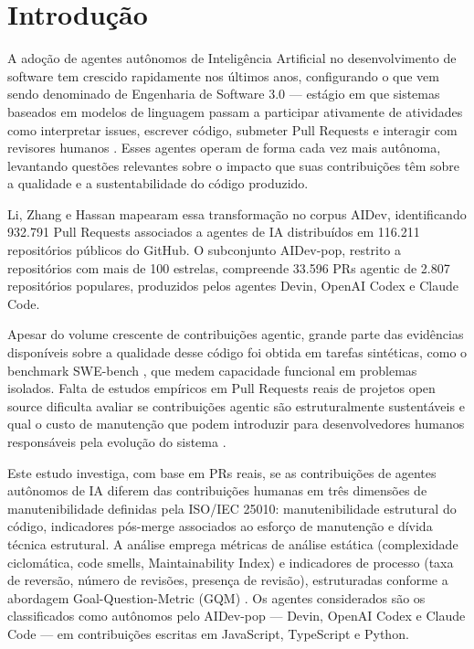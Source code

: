 \documentclass[12pt]{article}
\begin{document}
\section{Introdução}

A adoção de agentes autônomos de Inteligência Artificial no desenvolvimento
de software tem crescido rapidamente nos últimos anos, configurando o que
vem sendo denominado de Engenharia de Software 3.0 \cite{li:25} ---
estágio em que sistemas baseados em modelos de linguagem passam a participar
ativamente de atividades como interpretar issues, escrever código, submeter
Pull Requests e interagir com revisores humanos \cite{vaithilingam:22,finnie:23}.
Esses agentes operam de forma cada vez mais autônoma, levantando questões
relevantes sobre o impacto que suas contribuições têm sobre a qualidade e a
sustentabilidade do código produzido.

Li, Zhang e Hassan \cite{li:25} mapearam essa transformação no corpus
AIDev, identificando 932.791 Pull Requests associados a agentes de IA
distribuídos em 116.211 repositórios públicos do GitHub. O subconjunto
AIDev-pop, restrito a repositórios com mais de 100 estrelas, compreende
33.596 PRs agentic de 2.807 repositórios populares, produzidos pelos
agentes Devin, OpenAI Codex e Claude Code.

Apesar do volume crescente de contribuições agentic, grande parte das
evidências disponíveis sobre a qualidade desse código foi obtida em tarefas
sintéticas, como o benchmark SWE-bench \cite{jimenez:24}, que medem
capacidade funcional em problemas isolados. Falta de estudos empíricos em
Pull Requests reais de projetos open source dificulta avaliar se contribuições
agentic são estruturalmente sustentáveis e qual o custo de manutenção que
podem introduzir para desenvolvedores humanos responsáveis pela evolução
do sistema \cite{dakhel:23}.

Este estudo investiga, com base em PRs reais, se as contribuições de agentes
autônomos de IA diferem das contribuições humanas em três dimensões de
manutenibilidade definidas pela ISO/IEC 25010: manutenibilidade estrutural
do código, indicadores pós-merge associados ao esforço de manutenção e
dívida técnica estrutural. A análise emprega métricas de análise estática
(complexidade ciclomática, code smells, Maintainability Index) e indicadores
de processo (taxa de reversão, número de revisões, presença de revisão),
estruturadas conforme a abordagem Goal-Question-Metric (GQM)
\cite{basili:94}. Os agentes considerados são os classificados como
autônomos pelo AIDev-pop --- Devin, OpenAI Codex e Claude Code --- em
contribuições escritas em JavaScript, TypeScript e Python.
\end{document}
